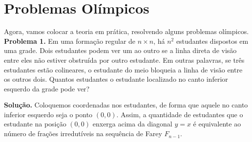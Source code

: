 \documentclass{hipatia}
\newtheorem*{theorem*}{Teorema}
\theoremstyle{definition} %
\begin{document}
%
%


\section{Problemas Olímpicos}

Agora, vamos colocar a teoria em prática, resolvendo alguns problemas olímpicos.\\

\noindent \textbf{Problema 1.} Em uma formação regular de \(n \times n\), há $n^2$ estudantes dispostos em uma grade. Dois estudantes podem ver um ao outro se a linha direta de visão entre eles não estiver obstruída por outro estudante. Em outras palavras, se três estudantes estão colineares, o estudante do meio bloqueia a linha de visão entre os outros dois. Quantos estudantes o estudante localizado no canto inferior esquerdo da grade pode ver?\vspace{0.2cm}

\noindent \textbf{Solução.} Coloquemos coordenadas nos estudantes, de forma que aquele no canto inferior esquerdo seja o ponto $(0,0)$. Assim, a quantidade de estudantes que o estudante na posição $(0,0)$ enxerga acima da diagonal \(y = x\) é equivalente ao número de frações irredutíveis na sequência de Farey \(F_{n-1}\).
\end{document}
